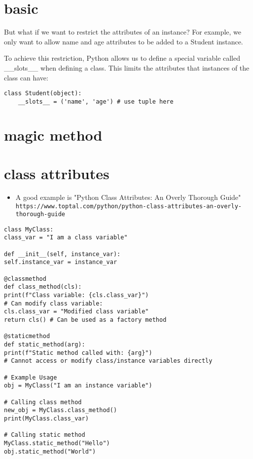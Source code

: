 \documentclass[a4paper,12pt,twoside]{book}
\begin{document}
\section{basic}

	
	But what if we want to restrict the attributes of an instance? For example, we only want to allow name and age attributes to be added to a Student instance.
	
	To achieve this restriction, Python allows us to define a special variable called \_\_slots\_\_ when defining a class. This limits the attributes that instances of the class can have:
\begin{lstlisting}
class Student(object):
	__slots__ = ('name', 'age') # use tuple here
\end{lstlisting}
	


\section{magic method}



\section{class attributes}
\begin{itemize}
	
	\item A good example is "Python Class Attributes: An Overly Thorough Guide" \verb!https://www.toptal.com/python/python-class-attributes-an-overly-thorough-guide!
\end{itemize}

\begin{lstlisting}
class MyClass:
class_var = "I am a class variable"

def __init__(self, instance_var):
self.instance_var = instance_var

@classmethod
def class_method(cls):
print(f"Class variable: {cls.class_var}")
# Can modify class variable:
cls.class_var = "Modified class variable"
return cls() # Can be used as a factory method

@staticmethod
def static_method(arg):
print(f"Static method called with: {arg}")
# Cannot access or modify class/instance variables directly

# Example Usage
obj = MyClass("I am an instance variable")

# Calling class method
new_obj = MyClass.class_method() 
print(MyClass.class_var)

# Calling static method
MyClass.static_method("Hello")
obj.static_method("World")
\end{lstlisting}
\end{document}

